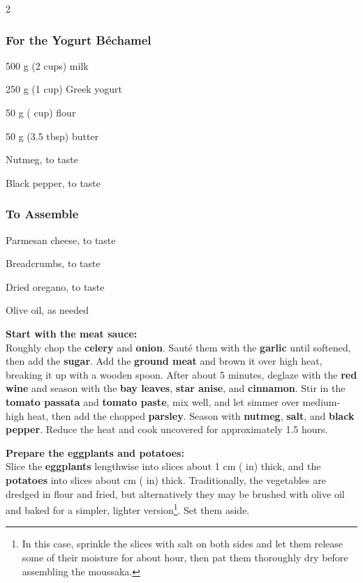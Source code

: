 \begin{multicols}{2}
	\subsubsection*{For the Yogurt Béchamel}
	\begin{ingredients}
		\item 500 g (2 cups) milk
		\item 250 g (1 cup) Greek yogurt
		\item 50 g ( cup) flour
		\item 50 g (3.5 tbsp) butter
		\item Nutmeg, to taste
		\item Black pepper, to taste
	\end{ingredients}
	
	\subsubsection*{To Assemble}
	\begin{ingredients}
		\item Parmesan cheese, to taste
		\item Breadcrumbs, to taste
		\item Dried oregano, to taste
		\item Olive oil, as needed
	\end{ingredients}
	
\end{multicols}

\textbf{Start with the meat sauce:} \\
Roughly chop the \textbf{celery} and \textbf{onion}.
Sauté them with the \textbf{garlic} until softened, then add the \textbf{sugar}.
Add the \textbf{ground meat} and brown it over high heat, breaking it up with a wooden spoon.
After about 5 minutes, deglaze with the \textbf{red wine} and season with the \textbf{bay leaves}, \textbf{star anise}, and \textbf{cinnamon}.
Stir in the \textbf{tomato passata} and \textbf{tomato paste}, mix well, and let simmer over medium-high heat, then add the chopped \textbf{parsley}.
Season with \textbf{nutmeg}, \textbf{salt}, and \textbf{black pepper}.
Reduce the heat and cook uncovered for approximately 1.5 hours.

\textbf{Prepare the eggplants and potatoes:} \\
Slice the \textbf{eggplants} lengthwise into slices about 1 cm ( in) thick, and the \textbf{potatoes} into slices about  cm ( in) thick.
Traditionally, the vegetables are dredged in flour and fried, but alternatively they may be brushed with olive oil and baked for a simpler, lighter version\footnote{In this case, sprinkle the slices with salt on both sides and let them release some of their moisture for about  hour, then pat them thoroughly dry before assembling the moussaka.}.
Set them aside.

